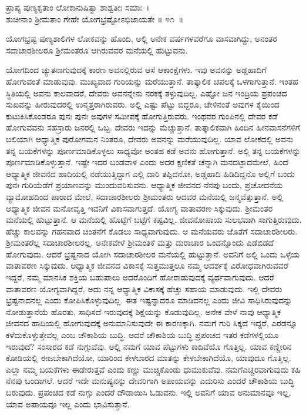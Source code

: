 \begin{shloka}
ಪ್ರಾಪ್ಯ ಪುಣ್ಯಕೃತಾಂ ಲೋಕಾನುಷಿತ್ವಾ ಶಾಶ್ವತೀಃ ಸಮಾಃ~।\\ಶುಚೀನಾಂ ಶ‍್ರೀಮತಾಂ ಗೇಹೇ ಯೋಗಭ್ರಷ್ಟೋಽಭಿಜಾಯತೇ \hfill॥ ೪೧~॥
\end{shloka}

\begin{artha}
ಯೋಗಭ್ರಷ್ಟ ಪುಣ್ಯಶಾಲಿಗಳ ಲೋಕವನ್ನು ಹೊಂದಿ, ಅಲ್ಲಿ ಅನೇಕ ವರ್ಷಗಳವರೆಗೂ ವಾಸವಾಗಿದ್ದು, ಅನಂತರ ಸದಾಚಾರಶೀಲರೂ ಶ‍್ರೀಮಂತರೂ ಆಗಿರುವವರ ಮನೆಯಲ್ಲಿ ಹುಟ್ಟುವನು.
\end{artha}

ಯೋಗದಿಂದ ಚ್ಯುತನಾಗುವುದಕ್ಕೆ ಕಾರಣ ಅವನಲ್ಲಿರುವ ಆಸೆ ಆಕಾಂಕ್ಷೆಗಳು. ಇವು ಅವನನ್ನು ಅಡ್ಡಹಾದಿಗೆ ಹೋಗುವಂತೆ ಮಾಡುವುವು. ಮುಖ್ಯವಾದ ಗುರಿಯನ್ನು ಮರೆಯುತ್ತಾನೆ. ತಾತ್ಕಾಲಿಕ ಚಪಲಕ್ಕೆ ಒಳಗಾಗುತ್ತಾನೆ. ಇಂತಹ ಸ್ಥಿತಿಯಲ್ಲಿ ಅವನು ಕಾಲವಾದರೆ, ದೇವರು ಅವನನ್ನೇನು ನರಕಕ್ಕೆ ತಳ್ಳುವುದಿಲ್ಲ. ಎಷ್ಟೋ ಜನ ಇಂದ್ರಿಯ ಪ್ರಪಂಚದ ಸುಖವನ್ನು ಹೀರುವುದರಲ್ಲಿ ಉನ್ಮತ್ತರಾಗಿರುವರು. ಅಲ್ಲಿ ಎಷ್ಟು ಪೆಟ್ಟು ಬಿದ್ದರೂ, ಚೇಳಿನಂತೆ ಅವುಗಳ ಕೈಯಿಂದ ಕುಟುಕಿಸಿಕೊಂಡರೂ ಪುನಃ ಪುನಃ ಅವುಗಳ ಸಮೀಪಕ್ಕೆ ಹೋಗುತ್ತಿರುವರು. ಇಂಥವರ ಗುಂಪಿನಲ್ಲಿ ದೇವರ ಕಡೆ ಹೋಗುವವನು ಸಹಸ್ರಾರು ಜನರಲ್ಲಿ ಒಬ್ಬ. ದೇವರು ಇದನ್ನು ಮೆಚ್ಚುತ್ತಾನೆ. ತಾತ್ಕಾಲಿಕವಾಗಿ ಹಿಂದಿನ ಹೀನವಾಸನೆಗಳಿಗೆ ಬಲಿಯಾಗಿ ಆಧ್ಯಾತ್ಮಿಕ ಪುರೋಗಮನ ನಿಂತರೂ, ದೇವರು ಅವನನ್ನು ಮರೆಯುವುದಿಲ್ಲ. ಯಾವ ಲೋಕದಲ್ಲಿ ಅವನು ತನ್ನ ಬಯಕೆಗಳನ್ನು ಪೂರ್ಣಮಾಡಿಕೊಳ್ಳಲು ಸಾಧ್ಯವೋ ಅಂತಹ ಕಡೆ ಅವನು ಹೋಗುತ್ತಾನೆ. ಅಲ್ಲಿ ತನ್ನ ಬಯಕೆಗಳನ್ನು ಪೂರ್ಣಮಾಡಿಕೊಳ್ಳುತ್ತಾನೆ. ಇಷ್ಟೇ ಇದರ ಬಂಡವಾಳ ಎಂದು ಅದರ ಕ್ಷಣಿಕತೆ ಚೆನ್ನಾಗಿ ಮನದಟ್ಟಾದಮೇಲೆ, ಹಿಂದೆ ಆಧ್ಯಾತ್ಮಿಕ ಜೀವನದ ಹಾದಿಯಲ್ಲಿ ನಡೆಯುತ್ತಿದ್ದಾಗ ಎಲ್ಲಿ ದಾರಿ ತಪ್ಪಿದನೋ, ಅಡ್ಡಹಾದಿ ಹಿಡಿದಿದ್ದನೊ ಅಲ್ಲಿಗೆ ಬಂದು ಪುನಃ ಗುರಿಯೆಡೆಗೆ ಪ್ರಯಾಣವನ್ನು ಮುಂದುವರಿಸುವನು. ಆಧ್ಯಾತ್ಮಿಕ ಜೀವನದ ನೆನಪು ಬಂದು, ಪ್ರಚೋದನೆಯ ವ್ಯಾಮೋಹದಿಂದ ಪಾರಾದ ಮೇಲೆ, ಸದಾಚಾರಶೀಲರು ಶ‍್ರೀಮಂತರು ಆದವರ ಮನೆಯಲ್ಲಿ ಜನ್ಮವೆತ್ತುತ್ತಾನೆ. ಅಲ್ಲಿ ಆಧ್ಯಾತ್ಮಿಕ ಜೀವನ ಮನೋವೃತ್ತಿ ಇವನಿಗೆ ವಿಕಾಸವಾಗುತ್ತದೆ. ಯೋಗ್ಯ ವಾತಾವರಣ ಸಿಕ್ಕುವುದು. ಶ‍್ರೀಮಂತರ ಮನೆಯಲ್ಲಿ ಹುಟ್ಟುತ್ತಾನೆ. ಆ ಮನೆಯಲ್ಲಿ ಹೊಟ್ಟೆಗೆ ಬಟ್ಟೆಗೆ ಕಷ್ಟವಿಲ್ಲ. ಜೀವನೋಪಾಯ ಸುಲಭವಾಗಿ ಸಾಗುತ್ತಿರುವುದು. ಹೆಚ್ಚು ಕಾಲವನ್ನು ಗಹನವಾದ ಚಿಂತನೆಗೆ ಕೊಡಲು ಸಾಧ್ಯವಾಗುವುದು. ಆ ಮನೆಯವರು ಜೊತೆಗೆ ಸದಾಚಾರಶೀಲರು. ಶ‍್ರೀಮಂತರೆಲ್ಲ ಸದಾಚಾರಶೀಲರಲ್ಲ. ಅನೇಕವೇಳೆ ಶ‍್ರೀಮಂತಿಕೆ ಮತ್ತು ದುರಾಚಾರ ಒಂದನ್ನೊಂದು ಎಡೆಬಿಡದೆ ಹೋಗುವುದು. ಆದರೆ ಭ್ರಷ್ಟನಾದ ಯೋಗಿ ಸದಾಚಾರಶೀಲರ ಮನೆಯಲ್ಲಿ ಹುಟ್ಟುತ್ತಾನೆ. ಅವನಿಗೆ ಅಲ್ಲಿ ಒಂದು ಒಳ್ಳೆಯ ವಾತಾವರಣ ಸಿಕ್ಕುವುದು. ಆಧ್ಯಾತ್ಮಿಕ ಜೀವನದ ವಿಕಾಸಕ್ಕೆ ಸುತ್ತಮುತ್ತಲೂ ನಮ್ಮ ಆದರ್ಶಕ್ಕೆ ವಿರೋಧವಾಗಿರುವವರೆ ಇದ್ದರೆ, ನಮ್ಮ ಮಾನಸಿಕ ಶಕ್ತಿಯ ಬಹುಪಾಲು ಅದರೊಂದಿಗೆ ಹೋರಾಡುವುದಕ್ಕೆ ವ್ಯರ್ಥವಾಗುವುದು. ಆದರೆ ವಾತಾವರಣ ಯೋಗ್ಯವಾಗಿದ್ದರೆ, ಅದು ನನ್ನ ಆಧ್ಯಾತ್ಮಿಕ ವಿಕಾಸಕ್ಕೆ ಹೆಚ್ಚು ಸಹಾಯ ಮಾಡುವುದು. ಇಲ್ಲಿ ದೇವರು ಭ್ರಷ್ಟನಾದನಲ್ಲ ಎಂದು ಕೋಪಿಸಿಕೊಳ್ಳುವುದಿಲ್ಲ. ಈತ ಇಷ್ಟನ್ನಾದರೂ ಮಾಡಿದನಲ್ಲ ಎಂದು ಜೀವಿ ಸಾಧಿಸಿರುವುದನ್ನು ನೋಡುತ್ತಾನೆಯೆ ಹೊರತು, ಸಾಧಿಸದೆ ಇರುವುದಕ್ಕೆ ಶಿಕ್ಷೆಯನ್ನು ಕೊಡುವುದಿಲ್ಲ. ಅನೇಕ ವೇಳೆ ನಾವು ಆಧ್ಯಾತ್ಮಿಕ ಜೀವನದ ಹಾದಿಯಲ್ಲಿ ಹೋಗುವುದಕ್ಕೆ ಅನುಮಾನಿಸುವುದೇ ಈ ಕಾರಣಕ್ಕಾಗಿ. ನಮಗೆ ಗುರಿ ಸಿಕ್ಕದೆ ಇದ್ದರೆ, ಎರಡನ್ನೂ ಕಳೆದುಕೊಳ್ಳುತ್ತೇವಲ್ಲ ಎಂಬ ಚೌಕಾಶಿಯ ಬುದ್ಧಿ. ಆದರೆ ಚೌಕಾಶಿಯ ಬುದ್ಧಿ ಪ್ರಪಂಚದ ಇತರ ಕಡೆಗಳಲ್ಲಿಯೂ ಇರುವುದೆ? ಸಂಸಾರದ ಕಡೆ ನುಗ್ಗುವೆವು. ಅಲ್ಲಿ ನಮಗೆ ಯಾವ ಪೆಟ್ಟುಗಳು ಕಾದಿವೆಯೊ ಗೊತ್ತಿಲ್ಲ. ಯಾವ ಕಣ್ಣೀರಿನ ಕೋಡಿಯಲ್ಲಿ ಈಜಬೇಕಾಗಿದೆಯೋ, ಯಾರಿಂದ ಕೇಳಬಾರದ ಮಾತನ್ನು ಕೇಳಬೇಕಾಗಿದೆಯೊ, ಯಾವುದೂ ಗೊತ್ತಿಲ್ಲ. ಎಲ್ಲಾ ನಮ್ಮ ಬಯಕೆಗಳು ಈಡೇರುತ್ತವೆ ಎಂದು ಕಣ್ಣು ಮುಚ್ಚಿಕೊಂಡು ಧುಮುಕುವೆವು. ನಮಗೆಎಚ್ಚರವಾಗುವುದು ಕಹಿ ನೆನಪು ಬಂದಾಗಲೆ. ಆದರೆ ಇದೇ ಮನುಷ್ಯನನ್ನು ದೇವರಿಗಾಗಿ ಅಪಾಯವನ್ನು ಎದುರಿಸು ಎಂದರೆ ಚೌಕಾಶಿಯ ಬುದ್ಧಿ ಬರುವುದು. ಪ್ರಪಂಚದ ಕಡೆ ನುಗ್ಗು ಎಂದರೆ ದೌಡಾಯಿಸಿ ಓಡುವನು. ಇಲ್ಲಿ ಅವನಿಗೆ ಯಾವ ಅನುಮಾನವೂ ಇಲ್ಲ, ಯಾವ ಅಪಾಯವೂ ಇಲ್ಲ ಎಂದು ಭಾವಿಸುತ್ತಾನೆ.

